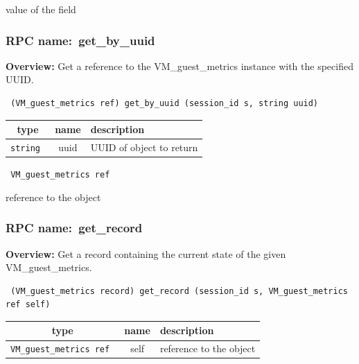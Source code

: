 value of the field
\vspace{0.3cm}
\vspace{0.3cm}
\vspace{0.3cm}
\subsubsection{RPC name:~get\_by\_uuid}

{\bf Overview:} 
Get a reference to the VM\_guest\_metrics instance with the specified UUID.

\begin{verbatim} (VM_guest_metrics ref) get_by_uuid (session_id s, string uuid)\end{verbatim}



 
\vspace{0.3cm}
\begin{tabular}{|c|c|p{7cm}|}
 \hline
{\bf type} & {\bf name} & {\bf description} \\ \hline
{\tt string } & uuid & UUID of object to return \\ \hline 

\end{tabular}

\vspace{0.3cm}

{\tt 
VM\_guest\_metrics ref
}


reference to the object
\vspace{0.3cm}
\vspace{0.3cm}
\vspace{0.3cm}
\subsubsection{RPC name:~get\_record}

{\bf Overview:} 
Get a record containing the current state of the given VM\_guest\_metrics.

\begin{verbatim} (VM_guest_metrics record) get_record (session_id s, VM_guest_metrics ref self)\end{verbatim}



 
\vspace{0.3cm}
\begin{tabular}{|c|c|p{7cm}|}
 \hline
{\bf type} & {\bf name} & {\bf description} \\ \hline
{\tt VM\_guest\_metrics ref } & self & reference to the object \\ \hline 

\end{tabular}

